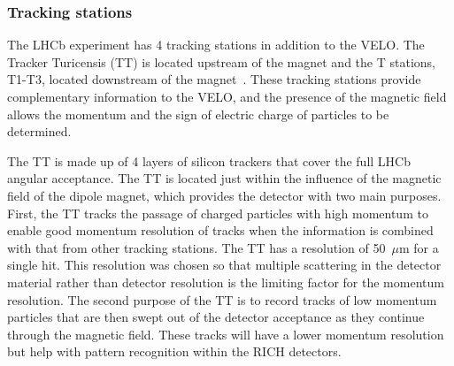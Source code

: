 


\subsubsection{Tracking stations} 
\label{Tracking_Stations}
The LHCb experiment has 4 tracking stations in addition to the VELO. The Tracker Turicensis (TT) is located upstream of the magnet and the T stations, T1-T3, located downstream of the magnet~\cite{Barbosa-Marinho:582793, Barbosa-Marinho:519146}. These tracking stations provide complementary information to the VELO, and the presence of the magnetic field allows the momentum and the sign of electric charge of particles to be determined. 



The TT is made up of 4 layers of silicon trackers that cover the full LHCb angular acceptance. The TT is located just within the influence of the magnetic field of the dipole magnet, which provides the detector with two main purposes. First, the TT tracks the passage of charged particles with high momentum to enable good momentum resolution of tracks when the information is combined with that from other tracking stations. The TT has a resolution of 50~$\mu$m for a single hit. This resolution was chosen so that multiple scattering in the detector material rather than detector resolution is the limiting factor for the momentum resolution. The second purpose of the TT is to record tracks of low momentum particles that are then swept out of the detector acceptance as they continue through the magnetic field. These tracks will have a lower momentum resolution but help with pattern recognition within the RICH detectors. 



